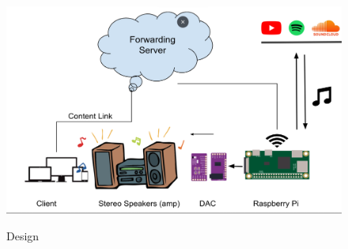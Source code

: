 \begin{figure}[H]
  \caption{Design}
  \includegraphics[scale=.4]{./implement.png}
  \\[0.2in]
\end{figure}
